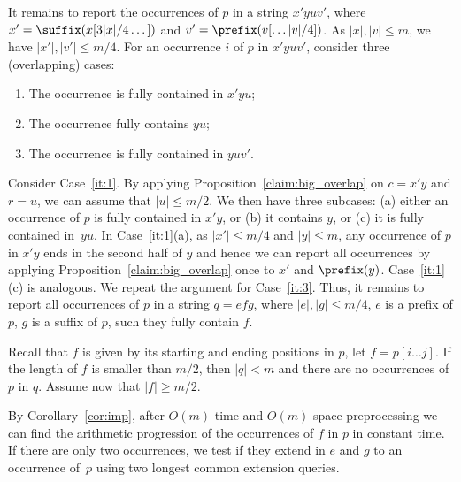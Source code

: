 It remains to report the occurrences of $p$ in a string $x' yu v'$, where $x' = \suffix(x[3|x|/4 \dots])$ and $v' = \prefix(v[\dots |v|/4])$. As $|x|, |v| \le m$, we have $|x'|, |v'| \le m/4$. For an occurrence $i$ of $p$ in $x' yu v'$, consider three (overlapping) cases:
\begin{enumerate}
\item \label{it:1} The occurrence is fully contained in $x'yu$;
\item \label{it:2} The occurrence fully contains $yu$;
\item \label{it:3} The occurrence is fully contained in $yuv'$.
\end{enumerate}
Consider Case~\ref{it:1}. By applying  Proposition~\ref{claim:big_overlap} on $c = x'y$ and $r = u$, we can assume that $|u| \le m/2$. We then have three subcases: (a) either an occurrence of $p$ is fully contained in $x'y$, or (b) it contains $y$, or (c) it is fully contained in~$yu$. In Case~\ref{it:1}(a), as $|x'| \le m/4$ and $|y| \le m$, any occurrence of $p$ in $x'y$ ends in the second half of $y$ and hence we can report all occurrences by applying Proposition~\ref{claim:big_overlap} once to $x'$ and $\prefix(y)$. Case~\ref{it:1}(c) is analogous. We repeat the argument for Case~\ref{it:3}. Thus, it remains to report all occurrences of $p$ in a string $q=efg$, where $|e|, |g| \le m/4$, $e$ is a prefix of $p$, $g$ is a suffix of $p$, such they fully contain $f$.

Recall that $f$ is given by its starting and ending positions in $p$, let $f = p[i \dots j]$. If the length of $f$ is smaller than $m/2$, then $|q|<m$ and there are no occurrences of $p$ in $q$. Assume now that $|f| \ge m/2$.

 
By Corollary~\ref{cor:imp}, after $O(m)$-time and $O(m)$-space preprocessing we can find the arithmetic progression of the occurrences of $f$ in $p$ in constant time. If there are only two occurrences, we test if they extend in $e$ and $g$ to an occurrence of~$p$ using two longest common extension queries. 

